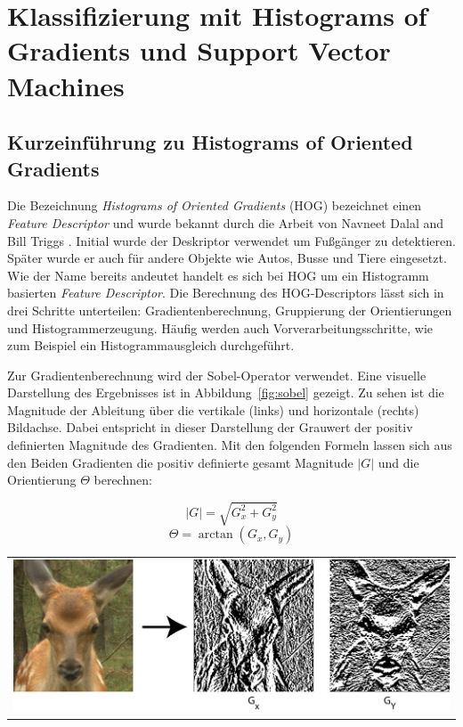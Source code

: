 \newpage
\section{Klassifizierung mit Histograms of Gradients und Support Vector Machines}

\subsection{Kurzeinführung zu Histograms of Oriented Gradients}

Die Bezeichnung \textit{Histograms of Oriented Gradients} (HOG) bezeichnet einen \textit{Feature Descriptor} und wurde bekannt durch die Arbeit von Navneet Dalal and Bill Triggs \cite{dalal05}. Initial wurde der Deskriptor verwendet um Fußgänger zu detektieren. Später wurde er auch für andere Objekte wie Autos, Busse und Tiere eingesetzt. Wie der Name bereits andeutet handelt es sich bei HOG um ein Histogramm basierten \textit{Feature Descriptor}. Die Berechnung des HOG-Descriptors lässt sich in drei Schritte unterteilen: Gradientenberechnung, Gruppierung der Orientierungen und Histogrammerzeugung. Häufig werden  auch Vorverarbeitungsschritte, wie zum Beispiel ein Histogrammausgleich durchgeführt.

Zur Gradientenberechnung wird der Sobel-Operator verwendet. Eine visuelle Darstellung des Ergebnisses ist in Abbildung~\ref{fig:sobel} gezeigt. Zu sehen ist die Magnitude der Ableitung über die vertikale (links) und horizontale (rechts) Bildachse. Dabei entspricht in dieser Darstellung der Grauwert der positiv definierten Magnitude des Gradienten. Mit den folgenden Formeln lassen sich aus den Beiden Gradienten die positiv definierte gesamt Magnitude $|G|$ und die Orientierung $\Theta$ berechnen:  

\begin{equation}
|G| = \sqrt{G_x^2 + G_y^2}
\end{equation}
\begin{equation}
\Theta = \arctan({G_x, G_y})
\end{equation}

\begin{center}
\begin{tabular}{c}
\includegraphics[trim={0 0cm 0cm 0cm},clip=true,width=13cm]{img/sobel.png}
\end{tabular}
\label{fig:sobel}
\end{center}

